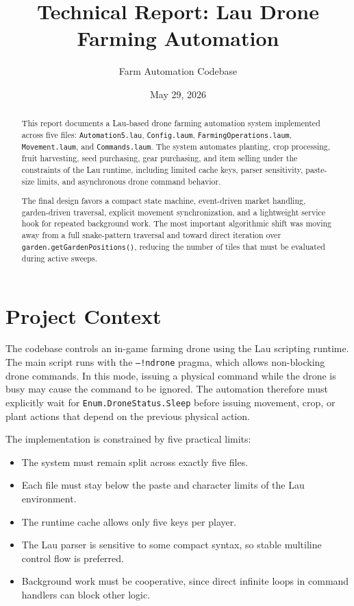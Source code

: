 \documentclass[11pt]{article}
\title{Technical Report: Lau Drone Farming Automation}
\author{Farm Automation Codebase}
\date{May 29, 2026}
\begin{document}
\maketitle

\begin{abstract}
This report documents a Lau-based drone farming automation system implemented
across five files: \texttt{Automation5.lau}, \texttt{Config.laum},
\texttt{FarmingOperations.laum}, \texttt{Movement.laum}, and
\texttt{Commands.laum}. The system automates planting, crop processing, fruit
harvesting, seed purchasing, gear purchasing, and item selling under the
constraints of the Lau runtime, including limited cache keys, parser
sensitivity, paste-size limits, and asynchronous drone command behavior.

The final design favors a compact state machine, event-driven market handling,
garden-driven traversal, explicit movement synchronization, and a lightweight
service hook for repeated background work. The most important algorithmic shift
was moving away from a full snake-pattern traversal and toward direct iteration
over \texttt{garden.getGardenPositions()}, reducing the number of tiles that
must be evaluated during active sweeps.
\end{abstract}

\section{Project Context}

The codebase controls an in-game farming drone using the Lau scripting runtime.
The main script runs with the \texttt{--!ndrone} pragma, which allows
non-blocking drone commands. In this mode, issuing a physical command while the
drone is busy may cause the command to be ignored. The automation therefore
must explicitly wait for \texttt{Enum.DroneStatus.Sleep} before issuing
movement, crop, or plant actions that depend on the previous physical action.

The implementation is constrained by five practical limits:

\begin{itemize}
    \item The system must remain split across exactly five files.
    \item Each file must stay below the paste and character limits of the Lau environment.
    \item The runtime cache allows only five keys per player.
    \item The Lau parser is sensitive to some compact syntax, so stable multiline control flow is preferred.
    \item Background work must be cooperative, since direct infinite loops in command handlers can block other logic.
\end{itemize}
\end{document}
